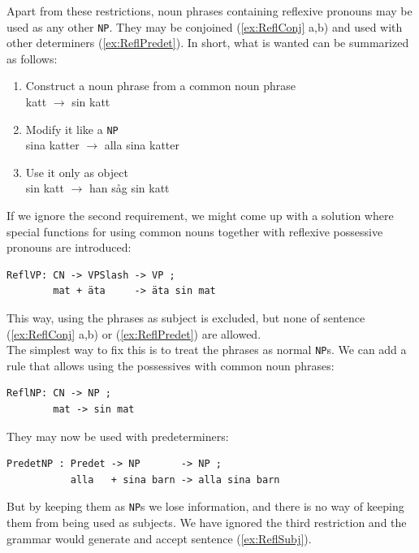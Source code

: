 \documentclass{report}
\begin{document}
Apart from these restrictions, noun phrases containing reflexive pronouns
may be used as any other \verb-NP-. They may be conjoined 
(\ref{ex:ReflConj} a,b) and used with other determiners (\ref{ex:ReflPredet}).
In short, what is wanted can be summarized as follows:\\
\begin{enumerate}
\item{
Construct a noun phrase from a common noun phrase \\
katt $\rightarrow$ sin katt} %
\item{Modify it like a \verb|NP|\\
sina katter $\rightarrow$ alla sina katter}
\item{Use it only as object\\
sin katt $\rightarrow$ han såg sin katt }
\end{enumerate}
If we ignore the second requirement, we might come up with a solution where
special functions for using common nouns
together with reflexive possessive pronouns are introduced:
\begin{verbatim}
ReflVP: CN -> VPSlash -> VP ;
        mat + äta     -> äta sin mat 
\end{verbatim}
This way, using the phrases as subject is excluded, but none of sentence
(\ref{ex:ReflConj} a,b) or (\ref{ex:ReflPredet}) are allowed.\\
The simplest way to fix this is to treat the phrases as normal \verb_NP_s.
We can add a rule that allows using the possessives with common noun phrases:
\begin{verbatim}
ReflNP: CN -> NP ;
        mat -> sin mat 
\end{verbatim}
They may now be used with predeterminers:
\begin{verbatim}
PredetNP : Predet -> NP       -> NP ;
           alla   + sina barn -> alla sina barn
\end{verbatim}
But by keeping them as \verb_NP_s we lose information, and there is no way of
keeping them from being used as subjects. We have ignored the third restriction
and the grammar would generate and accept sentence (\ref{ex:ReflSubj}).
\end{document}
